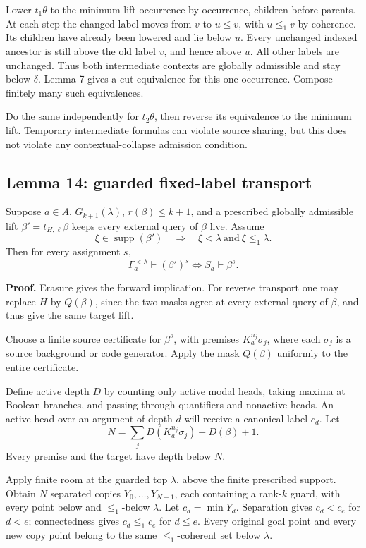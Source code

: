 \documentclass[
  11pt,
  letterpaper,
]{article}
\begin{document}
Lower \(t_1\theta\) to the minimum lift occurrence by occurrence,
children before parents. At each step the changed label moves from \(v\)
to \(u\leq v\), with \(u\leq_1v\) by coherence. Its children have
already been lowered and lie below \(u\). Every unchanged indexed
ancestor is still above the old label \(v\), and hence above \(u\). All
other labels are unchanged. Thus both intermediate contexts are globally
admissible and stay below \(\delta\). Lemma 7 gives a cut equivalence
for this one occurrence. Compose finitely many such equivalences.

Do the same independently for \(t_2\theta\), then reverse its
equivalence to the minimum lift. Temporary intermediate formulas can
violate source sharing, but this does not violate any
contextual-collapse admission condition.

\subsection{Lemma 14: guarded fixed-label
transport}\label{lemma-14-guarded-fixed-label-transport}

Suppose \(a\in A\), \(G_{k+1}(\lambda)\), \(r(\beta)\leq k+1\), and a
prescribed globally admissible lift \(\beta'=t_{H,\ell}\beta\) keeps
every external query of \(\beta\) live. Assume \[
\xi\in\operatorname{supp}(\beta')
\quad\Longrightarrow\quad \xi<\lambda\ \text{and}\ \xi\leq_1\lambda.
\] Then for every assignment \(s\), \[
\Gamma_a^{<\lambda}\vdash(\beta')^s
\iff S_a\vdash\beta^s.
\tag{4}
\]

\textbf{Proof.} Erasure gives the forward implication. For reverse
transport one may replace \(H\) by \(Q(\beta)\), since the two masks
agree at every external query of \(\beta\), and thus give the same
target lift.

Choose a finite source certificate for \(\beta^s\), with premises
\(K_a^{n_j}\sigma_j\), where each \(\sigma_j\) is a source background or
code generator. Apply the mask \(Q(\beta)\) uniformly to the entire
certificate.

Define active depth \(D\) by counting only active modal heads, taking
maxima at Boolean branches, and passing through quantifiers and
nonactive heads. An active head over an argument of depth \(d\) will
receive a canonical label \(c_d\). Let \[
N=\sum_j D(K_a^{n_j}\sigma_j)+D(\beta)+1.
\] Every premise and the target have depth below \(N\).

Apply finite room at the guarded top \(\lambda\), above the finite
prescribed support. Obtain \(N\) separated copies
\(Y_0,\ldots,Y_{N-1}\), each containing a rank-\(k\) guard, with every
point below and \(\leq_1\)-below \(\lambda\). Let \(c_d=\min Y_d\).
Separation gives \(c_d<c_e\) for \(d<e\); connectedness gives
\(c_d\leq_1c_e\) for \(d\leq e\). Every original goal point and every
new copy point belong to the same \(\leq_1\)-coherent set below
\(\lambda\).
\end{document}
